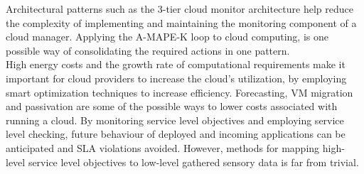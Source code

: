 \documentclass[a4paper]{llncs}
\begin{document}
Architectural patterns such as the 3-tier cloud monitor architecture help reduce the complexity of implementing and maintaining the monitoring component of a cloud manager. Applying the A-MAPE-K loop to cloud computing, is one possible way of consolidating the required actions in one pattern.\\

High energy costs and the growth rate of computational requirements make it important for cloud providers to increase the cloud’s utilization, by employing smart optimization techniques to increase efficiency. Forecasting, VM migration and passivation are some of the possible ways to lower costs associated with running a cloud. By monitoring service level objectives and employing service level checking, future behaviour of deployed and incoming applications can be anticipated and SLA violations avoided. However, methods for mapping high-level service level objectives to low-level gathered sensory data is far from trivial.
\end{document}
